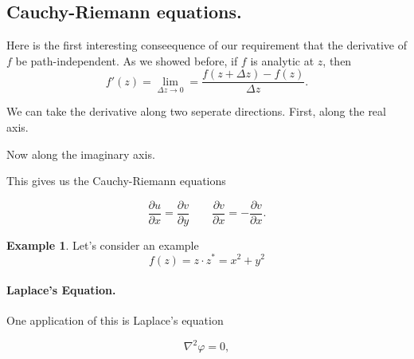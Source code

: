\documentclass[12pt]{article}
\newcommand{\pdiff}[2]{\frac{\partial #1}{\partial #2}}
\renewcommand{\phi}{\varphi}
\theoremstyle{definition}
\newtheorem{exmp}[thm]{Example}
\theoremstyle{remark}
\numberwithin{equation}{section}
\begin{document}

\subsection{Cauchy-Riemann equations.}%
\label{sub:cauchy_riemann_equations}

Here is the first interesting conseequence of our requirement that the derivative of $f$ be path-independent. As we showed before, if $f$ is analytic at $z$, then
\begin{equation}
  f'(z) = \lim_{\Delta z \to 0} = \frac{f(z + \Delta z) - f(z)}{\Delta z}.
\end{equation}

We can take the derivative along two seperate directions. First, along the real axis.


Now along the imaginary axis.


This gives us the Cauchy-Riemann equations

\begin{equation}
  \pdiff{u}{x} =\pdiff{v}{y} \quad\quad \pdiff{v}{x} = - \pdiff{v}{x}.
\end{equation}

\begin{exmp}
Let's consider an example
\begin{equation}
  f(z) = z \cdot z^* = x^2 + y^2
\end{equation}
\end{exmp}



\paragraph{Laplace's Equation.}%
\label{par:laplaces_equation}

One application of this is Laplace's equation

\begin{equation}
  \nabla^2 \phi = 0,
\end{equation}
\end{document}
